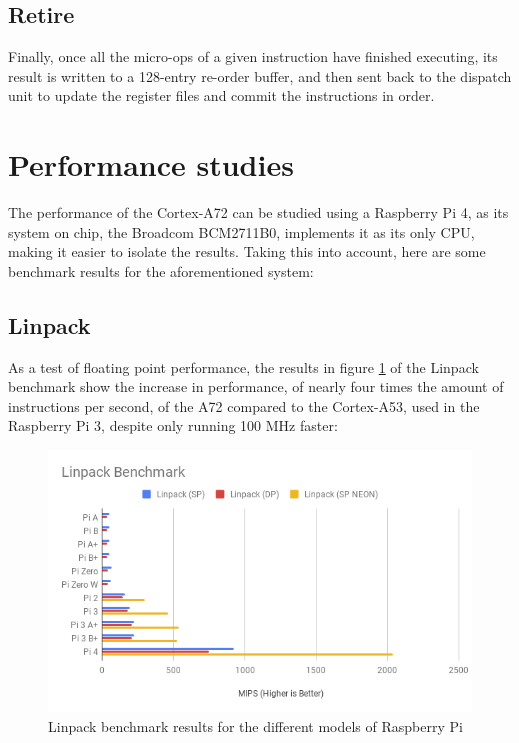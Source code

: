 \subsection*{Retire}
\hspace{\parindent}Finally, once all the micro-ops of a given instruction have finished executing, its result is written to a 128-entry re-order buffer, and then sent back to the dispatch unit to update the register files and commit the instructions in order.
\pagebreak{}
\section{Performance studies}
\hspace{\parindent}The performance of the Cortex-A72 can be studied using a Raspberry Pi 4, as its system on chip, the Broadcom BCM2711B0, implements it as its only CPU, making it easier to isolate the results. Taking this into account, here are some benchmark results for the aforementioned system:
\subsection*{Linpack}
\hspace{\parindent}As a test of floating point performance, the results in figure \ref{linpack} of the Linpack benchmark show the increase in performance, of nearly four times the amount of instructions per second, of the A72 compared to the Cortex-A53, used in the Raspberry Pi 3, despite only running 100 MHz faster: \cite{linpack}
\begin{figure}[H]
	\begin{center}
		\includegraphics[width=0.7\linewidth]{imgs/linpack.png}
		\caption{Linpack benchmark results for the different models of Raspberry Pi}
		\label{linpack}
	\end{center}
\end{figure}
